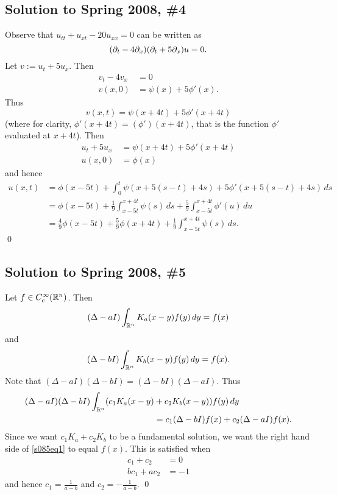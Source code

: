 \subsection*{Solution to Spring 2008, \#4}\label{s084}
Observe that $u_{tt} + u_{xt} - 20u_{xx} = 0$ can be written as
$$(\partial_{t} - 4\partial_{x})(\partial_{t} + 5\partial_{x})u = 0.$$
Let $v := u_{t} + 5u_{x}$. Then
\begin{align*}
v_{t} - 4v_{x}  &= 0\\
v(x, 0) &= \psi(x) + 5\phi'(x).
\end{align*}
Thus
$$v(x, t) = \psi(x + 4t) + 5\phi'(x + 4t)$$
(where for clarity, $\phi'(x + 4t) = (\phi')(x + 4t)$, that is the function $\phi'$ evaluated at $x + 4t$).
Then
\begin{align*}
u_{t} + 5u_{x} &= \psi(x + 4t) + 5\phi'(x + 4t)\\
u(x, 0) &= \phi(x)
\end{align*}
and hence
\begin{align*}
u(x, t) &= \phi(x - 5t) + \int_{0}^{t}\psi(x + 5(s - t) + 4s) + 5\phi'(x + 5(s - t) + 4s)\, ds\\
&= \phi(x - 5t) + \frac{1}{9}\int_{x - 5t}^{x + 4t}\psi(s)\, ds + \frac{5}{9}\int_{x - 5t}^{x + 4t}\phi'(u)\, du\\
&= \frac{4}{9}\phi(x - 5t) + \frac{5}{9}\phi(x + 4t) + \frac{1}{9}\int_{x - 5t}^{x + 4t}\psi(s)\, ds.
\end{align*}
\hfill\qed

\subsection*{Solution to Spring 2008, \#5}\label{s085}
Let $f \in C_{c}^{\infty}(\mathbb{R}^{n})$. Then
$$(\Delta - aI)\int_{\mathbb{R}^{n}}K_{a}(x - y)f(y)\, dy = f(x)$$
and
$$(\Delta - bI)\int_{\mathbb{R}^{n}}K_{b}(x - y)f(y)\, dy = f(x).$$
Note that $(\Delta - aI)(\Delta - bI) = (\Delta - bI)(\Delta - aI).$
Thus
\begin{align}\label{s085eq1}
\begin{aligned}
(\Delta - aI)(\Delta - bI)\int_{\mathbb{R}^{n}}(c_{1}K_{a}(x - y) &+ c_{2}K_{b}(x - y))f(y)\, dy\\
&= c_{1}(\Delta - bI)f(x) + c_{2}(\Delta - aI)f(x).
\end{aligned}
\end{align}
Since we want $c_{1}K_{a} + c_{2}K_{b}$ to be a fundamental solution, we want the right hand
side of \eqref{s085eq1} to equal $f(x)$. This is satisfied when
\begin{align*}
c_{1} + c_{2} &= 0\\
bc_{1} + ac_{2} &= -1
\end{align*}
and hence $c_{1} = \frac{1}{a - b}$ and $c_{2} = -\frac{1}{a - b}.$
\hfill\qed

